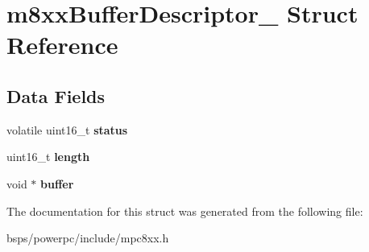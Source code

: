 \hypertarget{structm8xxBufferDescriptor__}{}\section{m8xx\+Buffer\+Descriptor\+\_\+ Struct Reference}
\label{structm8xxBufferDescriptor__}
\subsection*{Data Fields}
\begin{DoxyCompactItemize}
\item 
\mbox{\label{structm8xxBufferDescriptor___ab1201029b2c224a1464f658c5794f326}} 
volatile uint16\+\_\+t {\bfseries status}
\item 
\mbox{\label{structm8xxBufferDescriptor___af50831ab9714c0df6d941390375dae1e}} 
uint16\+\_\+t {\bfseries length}
\item 
\mbox{\label{structm8xxBufferDescriptor___af8bd026d945364ff1da1fe4572ca55fa}} 
void $\ast$ {\bfseries buffer}
\end{DoxyCompactItemize}


The documentation for this struct was generated from the following file\+:\begin{DoxyCompactItemize}
\item 
bsps/powerpc/include/mpc8xx.\+h\end{DoxyCompactItemize}
